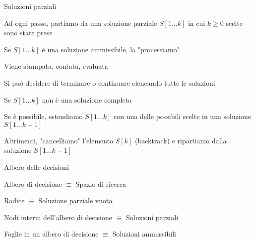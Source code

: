 \begin{frame}{Soluzioni parziali}

\BIL
\item Ad ogni passo, partiamo da una soluzione parziale $S[1 \ldots k]$ in cui
$k \geq 0$ scelte sono state prese
\item Se $S[1 \ldots k]$ è una soluzione ammissibile, la "processiamo" 
  \BI
	\item Viene stampata, contata, evaluata
	\item Si può decidere di terminare o continuare elencando tutte le soluzioni
	\EI
\item Se $S[1 \ldots k]$ non è una soluzione completa
  \BI
  \item Se è possibile, estendiamo $S[1 \ldots k]$ con una delle possibili 
	  scelte in una soluzione $S[1 \ldots k+1]$
	\item Altrimenti, "cancelliamo" l'elemento $S[k]$ (backtrack) 
	e ripartiamo dalla soluzione $S[1 \ldots k-1]$
  \EI
\EIL

\end{frame}

\begin{frame}{Albero delle decisioni}

\BI
\item \alert{Albero di decisione} $\equiv$ Spazio di ricerca
\item \alert{Radice} $\equiv$ Soluzione parziale vuota
\item \alert{Nodi interni dell'albero di decisione} $\equiv$ Soluzioni parziali  
\item \alert{Foglie in un albero di decisione} $\equiv$ Soluzioni ammissibili 
\EI

\medskip
\begin{overprint}
\centerline{}
\centerline{}
\centerline{}
\centerline{}
\centerline{}
\centerline{}
\centerline{}
\centerline{}
\centerline{}
\centerline{}
\end{overprint}

\end{frame}

